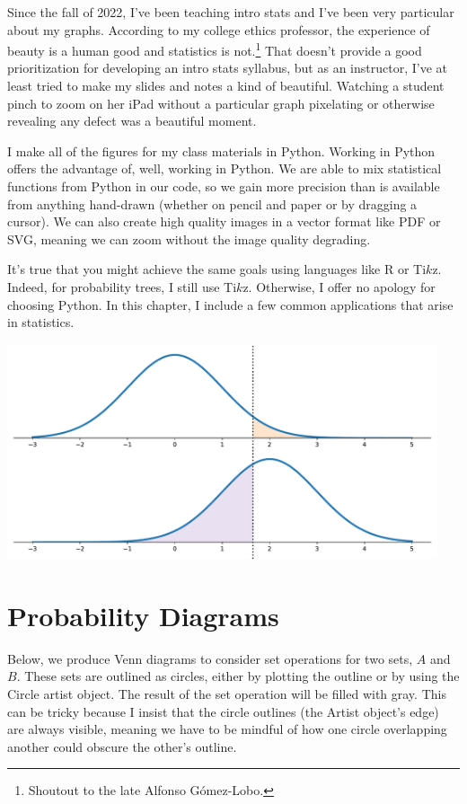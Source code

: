 
Since the fall of 2022, I've been teaching intro stats and I've been very particular about my graphs. According to my college ethics professor, the experience of beauty is a human good and statistics is not.\footnote{Shoutout to the late Alfonso G\'{o}mez-Lobo.} That doesn’t provide a good prioritization for developing an intro stats syllabus, but as an instructor, I've at least tried to make my slides and notes a kind of beautiful. Watching a student pinch to zoom on her iPad without a particular graph pixelating or otherwise revealing any defect was a beautiful moment. 

I make all of the figures for my class materials in Python. Working in Python offers the advantage of, well, working in Python. We are able to mix statistical functions from Python in our code, so we gain more precision than is available from anything hand-drawn (whether on pencil and paper or by dragging a cursor). We can also create high quality images in a vector format like PDF or SVG, meaning we can zoom without the image quality degrading. 

It's true that you might achieve the same goals using languages like R or Ti$k$z. Indeed, for probability trees, I still use Ti$k$z. Otherwise, I offer no apology for choosing Python. In this chapter, I include a few common applications that arise in statistics. 


\begin{center}
    \includegraphics[width = 0.95\textwidth]{figures/specialplots/errors-stacked.pdf}
\end{center}


\section{Probability Diagrams}

Below, we produce Venn diagrams to consider set operations for two sets, $A$ and $B$. These sets are outlined as circles, either by plotting the outline or by using the Circle artist object. The result of the set operation will be filled with gray. This can be tricky because I insist that the circle outlines (the Artist object's edge) are always visible, meaning we have to be mindful of how one circle overlapping another could obscure the other's outline. 

